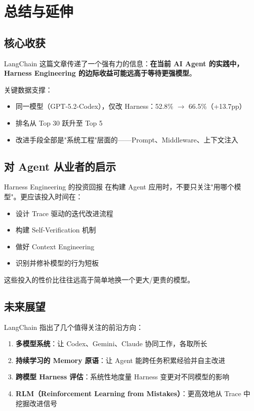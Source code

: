 \section{总结与延伸}

\subsection{核心收获}

LangChain 这篇文章传递了一个强有力的信息：\textbf{在当前 AI Agent 的实践中，Harness Engineering 的边际收益可能远高于等待更强模型}。

关键数据支撑：
\begin{itemize}[leftmargin=1.5em]
    \item 同一模型（GPT-5.2-Codex），仅改 Harness：52.8\% $\rightarrow$ 66.5\%（+13.7pp）
    \item 排名从 Top 30 跃升至 Top 5
    \item 改进手段全部是"系统工程"层面的——Prompt、Middleware、上下文注入
\end{itemize}

\subsection{对 Agent 从业者的启示}

\begin{importantbox}{Harness Engineering 的投资回报}
在构建 Agent 应用时，不要只关注"用哪个模型"。更应该投入时间在：
\begin{itemize}[leftmargin=1.5em]
    \item 设计 Trace 驱动的迭代改进流程
    \item 构建 Self-Verification 机制
    \item 做好 Context Engineering
    \item 识别并修补模型的行为短板
\end{itemize}
这些投入的性价比往往远高于简单地换一个更大/更贵的模型。
\end{importantbox}

\subsection{未来展望}

LangChain 指出了几个值得关注的前沿方向：
\begin{enumerate}[leftmargin=2em]
    \item \textbf{多模型系统}：让 Codex、Gemini、Claude 协同工作，各取所长
    \item \textbf{持续学习的 Memory 原语}：让 Agent 能跨任务积累经验并自主改进
    \item \textbf{跨模型 Harness 评估}：系统性地度量 Harness 变更对不同模型的影响
    \item \textbf{RLM（Reinforcement Learning from Mistakes）}：更高效地从 Trace 中挖掘改进信号
\end{enumerate}


